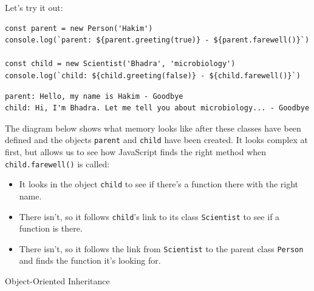 Let's try it out:

\begin{verbatim}
const parent = new Person('Hakim')
console.log(`parent: ${parent.greeting(true)} - ${parent.farewell()}`)

const child = new Scientist('Bhadra', 'microbiology')
console.log(`child: ${child.greeting(false)} - ${child.farewell()}`)
\end{verbatim}

\begin{verbatim}
parent: Hello, my name is Hakim - Goodbye
child: Hi, I'm Bhadra. Let me tell you about microbiology... - Goodbye
\end{verbatim}

The diagram below shows what memory looks like after these classes have
been defined and the objects \texttt{parent} and \texttt{child} have
been created. It looks complex at first, but allows us to see how
JavaScript finds the right method when \texttt{child.farewell()} is
called:

\begin{itemize}
\tightlist
\item
  It looks in the object \texttt{child} to see if there's a function
  there with the right name.
\item
  There isn't, so it follows \texttt{child}'s link to its class
  \texttt{Scientist} to see if a function is there.
\item
  There isn't, so it follows the link from \texttt{Scientist} to the
  parent class \texttt{Person} and finds the function it's looking for.
\end{itemize}

Object-Oriented Inheritance

